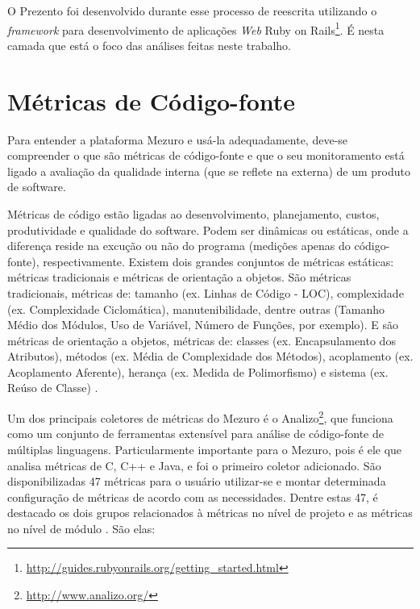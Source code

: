 O Prezento foi desenvolvido durante esse processo de reescrita utilizando o
\textit{framework} para desenvolvimento de aplicações \textit{Web} Ruby on
Rails\footnote{\url{http://guides.rubyonrails.org/getting_started.html}}.
%
É nesta camada que está o foco das análises feitas neste trabalho.

\section{Métricas de Código-fonte}

Para entender a plataforma Mezuro e usá-la adequadamente, deve-se compreender
o que são métricas de código-fonte e que o seu monitoramento está ligado a
avaliação da qualidade interna (que se reflete na externa) de um produto de
software.

Métricas de código estão ligadas ao desenvolvimento, planejamento, custos,
produtividade e qualidade do software. Podem ser dinâmicas ou estáticas, onde a
diferença reside na excução ou não do programa (medições apenas do código-fonte),
respectivamente. Existem dois grandes conjuntos de métricas estáticas:
métricas tradicionais e métricas de orientação a objetos. São métricas
tradicionais, métricas de: tamanho (ex. Linhas de Código - LOC), complexidade
(ex. Complexidade Ciclomática), manutenibilidade, dentre outras (Tamanho Médio
dos Módulos, Uso de Variável, Número de Funções, por exemplo). E são métricas de
orientação a objetos, métricas de: classes (ex. Encapsulamento dos Atributos),
métodos (ex. Média de Complexidade dos Métodos), acoplamento (ex. Acoplamento
Aferente), herança (ex. Medida de Polimorfismo) e sistema (ex. Reúso de Classe)
\cite{meirelles2013monitoramento}.

Um dos principais coletores de métricas do Mezuro é o Analizo\footnote{\url{http://www.analizo.org/}},
que funciona como um conjunto de ferramentas extensível para análise de
código-fonte de múltiplas linguagens. Particularmente importante para o Mezuro,
pois é ele que analisa métricas de C, C++ e Java, e foi o primeiro coletor
adicionado. São disponibilizadas 47 métricas para o usuário utilizar-se e montar
determinada configuração de métricas de acordo com as necessidades. Dentre estas
47, é destacado os dois grupos relacionados à métricas no nível de projeto e as
métricas no nível de módulo \cite{terceiro2010analizo}. São elas:

